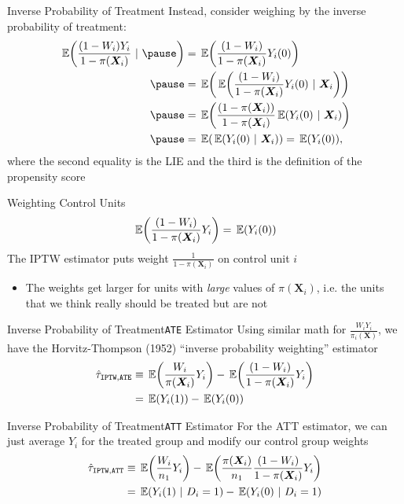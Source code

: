 \documentclass[aspectratio=169,t,11pt,table]{beamer}
\begin{document}
\begin{frame}{Inverse Probability of Treatment}
  Instead, consider weighing by the inverse probability of treatment:
  \begin{align*}
    \expec{\frac{(1 - W_i) Y_i}{1 - \pi(\bm{X}_i)}} \pause 
    &= \expec{\frac{(1 - W_i)}{1 - \pi(\bm{X}_i)} Y_i(0)} \\ \pause
    &= \expec{\expec{\frac{(1 - W_i) }{1 - \pi(\bm{X}_i)} Y_i(0)}{\bm{X}_i}} \\ \pause
    &= \expec{\frac{(1 - \pi(\bm{X}_i))}{1 - \pi(\bm{X}_i)} \expec{Y_i(0)}{\bm{X}_i}} \\ \pause
    &= \expec{\expec{Y_i(0)}{\bm{X}_i}} = \expec{Y_i(0)},
  \end{align*}
  where the second equality is the LIE and the third is the definition of the propensity score
\end{frame}

\begin{frame}{Weighting Control Units}
  \vspace*{-\bigskipamount}
  $$
    \expec{\frac{(1 - W_i)}{1 - \pi(\bm{X}_i)} Y_i} = \expec{Y_i(0)}
  $$
  The IPTW estimator puts weight $\frac{1}{1 - \pi(\bm{X}_i)}$ on control unit $i$
  \begin{itemize}
    \item The weights get larger for units with \emph{large} values of $\pi(\bm{X}_i)$, i.e. the units that we think really should be treated but are not
  \end{itemize}
\end{frame}

\begin{frame}{Inverse Probability of Treatment}{\texttt{ATE} Estimator}
  Using similar math for $\frac{W_i Y_i}{\pi_i(\bm{X})}$, we have the Horvitz-Thompson (1952) ``inverse probability weighting'' estimator
  \begin{align*}
    \hat{\tau}_{\texttt{IPTW},\texttt{ATE}} 
    &\equiv \expec{\frac{W_i}{\pi(\bm{X}_i)} Y_i} - \expec{\frac{(1 - W_i)}{1 - \pi(\bm{X}_i)} Y_i} \\
    &= \expec{Y_i(1)} - \expec{Y_i(0)}
  \end{align*}
\end{frame}

\begin{frame}{Inverse Probability of Treatment}{\texttt{ATT} Estimator}
  For the ATT estimator, we can just average $Y_i$ for the treated group and modify our control group weights
  \begin{align*}
    \hat{\tau}_{\texttt{IPTW},\texttt{ATT}}
    &\equiv \expec{\frac{W_i}{n_1} Y_i} - \expec{\frac{\pi(\bm{X}_i)}{n_1} \frac{(1 - W_i)}{1 - \pi(\bm{X}_i)} Y_i} \\
    &= \expec{Y_i(1)}{D_i = 1} - \expec{Y_i(0)}{D_i = 1}
  \end{align*}
\end{frame}
\end{document}
